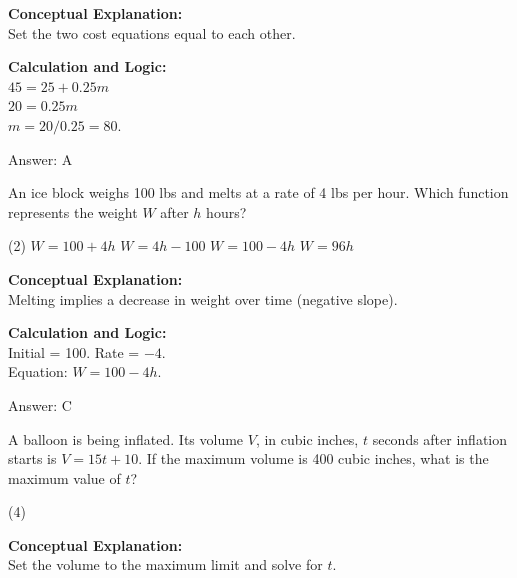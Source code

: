 \documentclass[11pt,paper=a4,answers]{exam}
\begin{document}
\begin{questions}
\begin{solution}
\textbf{Conceptual Explanation:} \\
Set the two cost equations equal to each other.

\vspace{10pt}
\textbf{Calculation and Logic:} \\
$45 = 25 + 0.25m$ \\
$20 = 0.25m$ \\
$m = 20 / 0.25 = 80$.

\vspace{15pt}
Answer: \colorbox{yellow!100}{A}
\end{solution}

\vspace{20pt}

\question
An ice block weighs 100 lbs and melts at a rate of 4 lbs per hour. Which function represents the weight $W$ after $h$ hours?
\begin{tasks}(2)
    \task $W = 100 + 4h$
    \task $W = 4h - 100$
    \task $W = 100 - 4h$
    \task $W = 96h$
\end{tasks}

\begin{solution}
\textbf{Conceptual Explanation:} \\
Melting implies a decrease in weight over time (negative slope).

\vspace{10pt}
\textbf{Calculation and Logic:} \\
Initial = 100. Rate = $-4$. \\
Equation: $W = 100 - 4h$.

\vspace{15pt}
Answer: \colorbox{yellow!100}{C}
\end{solution}

\vspace{20pt}

\question
A balloon is being inflated. Its volume $V$, in cubic inches, $t$ seconds after inflation starts is $V = 15t + 10$. If the maximum volume is 400 cubic inches, what is the maximum value of $t$?
\begin{tasks}(4)
\end{tasks}

\begin{solution}
\textbf{Conceptual Explanation:} \\
Set the volume to the maximum limit and solve for $t$.


\end{solution}
\end{questions}
\end{document}

